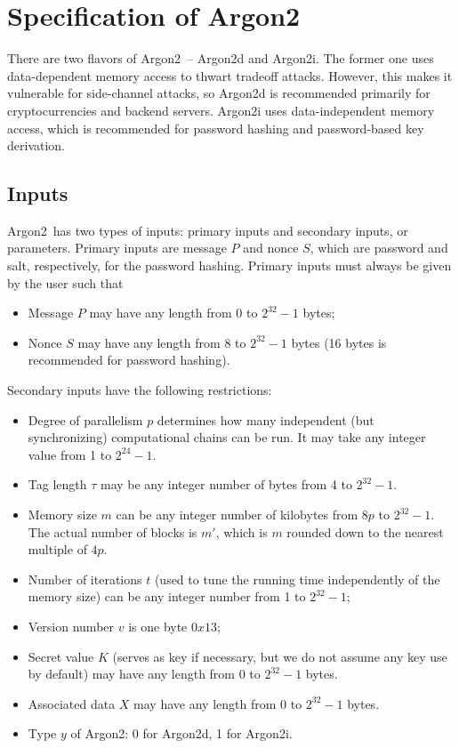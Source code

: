 \documentclass[a4paper]{article}
\begin{document}
\section{Specification of Argon2}

There are two flavors of \textsf{Argon2}\ -- \textsf{Argon2d} and \textsf{Argon2i}. The former one uses data-dependent memory access to thwart tradeoff attacks. However, this makes it vulnerable for side-channel attacks, so \textsf{Argon2d} is recommended primarily for cryptocurrencies and backend servers. \textsf{Argon2i} uses data-independent memory access, which is recommended for password hashing and password-based key derivation.

\subsection{Inputs}

\textsf{Argon2}\ has two types of inputs: primary inputs and secondary inputs, or parameters. Primary inputs are message $P$ and nonce $S$, which are password and salt, respectively, for the password hashing. Primary inputs must always be given by the user such that
\begin{itemize}
  \item Message $P$ may have any length from $0$ to $2^{32}-1$ bytes;
  \item Nonce $S$ may have any length from $8$ to $2^{32}-1$ bytes (16 bytes is recommended for password hashing).
\end{itemize}
 Secondary inputs have the following restrictions:
\begin{itemize}
  \item Degree of parallelism $p$ determines how many independent (but synchronizing) computational chains can be run.  It may take any integer value from 1 to $2^{24}-1$.
  \item Tag length $\tau$ may be any integer number of bytes from 4 to $2^{32}-1$.
  \item Memory size $m$ can be any integer number of kilobytes from $8p$ to $2^{32}-1$. The actual number of blocks is $m'$, which is $m$ rounded down to the nearest multiple of $4p$. 
  \item Number of iterations $t$ (used to tune the running time independently of the memory size) can be any integer number from 1 to $2^{32}-1$;
  \item Version number $v$ is one byte $0x13$;
  \item Secret value $K$ (serves as key if necessary, but we do not assume any key use by default) may have any length from $0$ to $2^{32}-1$ bytes.
  \item Associated data $X$ may have any length from $0$ to $2^{32}-1$ bytes.
  \item Type $y$ of \textsf{Argon2}: 0 for  \textsf{Argon2d}, 1 for \textsf{Argon2i}.
\end{itemize}
\end{document}
